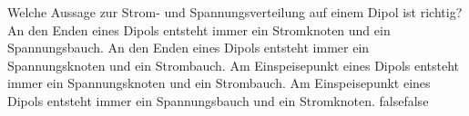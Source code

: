     {Welche Aussage zur Strom- und Spannungsverteilung auf einem Dipol ist richtig?}
    {An den Enden eines Dipols entsteht immer ein Stromknoten und ein Spannungsbauch.}
    {An den Enden eines Dipols entsteht immer ein Spannungsknoten und ein Strombauch.}
    {Am Einspeisepunkt eines Dipols entsteht immer ein Spannungsknoten und ein Strombauch.}
    {Am Einspeisepunkt eines Dipols entsteht immer ein Spannungsbauch und ein Stromknoten.}
    {false}{false}